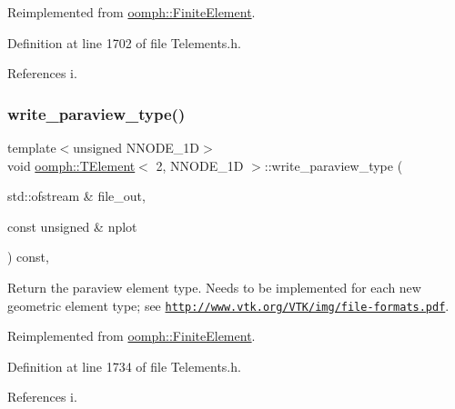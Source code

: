 Reimplemented from \hyperlink{classoomph_1_1FiniteElement_afed006dd5b9ab6bd613d8496e6048abf}{oomph\+::\+Finite\+Element}.



Definition at line 1702 of file Telements.\+h.



References i.

\mbox{\label{classoomph_1_1TElement_3_012_00_01NNODE__1D_01_4_a076e986424d283bbf44db36bce8f498a}} 
\subsubsection{\texorpdfstring{write\+\_\+paraview\+\_\+type()}{write\_paraview\_type()}}
{\footnotesize\ttfamily template$<$unsigned N\+N\+O\+D\+E\+\_\+1D$>$ \\
void \hyperlink{classoomph_1_1TElement}{oomph\+::\+T\+Element}$<$ 2, N\+N\+O\+D\+E\+\_\+1D $>$\+::write\+\_\+paraview\+\_\+type (\begin{DoxyParamCaption}\item[{std\+::ofstream \&}]{file\+\_\+out,  }\item[{const unsigned \&}]{nplot }\end{DoxyParamCaption}) const\hspace{0.3cm}{\ttfamily [inline]}, {\ttfamily [virtual]}}



Return the paraview element type. Needs to be implemented for each new geometric element type; see \href{http://www.vtk.org/VTK/img/file-formats.pdf}{\tt http\+://www.\+vtk.\+org/\+V\+T\+K/img/file-\/formats.\+pdf}. 



Reimplemented from \hyperlink{classoomph_1_1FiniteElement_a68f0f8dc76f04e7d69983ec711b4ab08}{oomph\+::\+Finite\+Element}.



Definition at line 1734 of file Telements.\+h.



References i.

